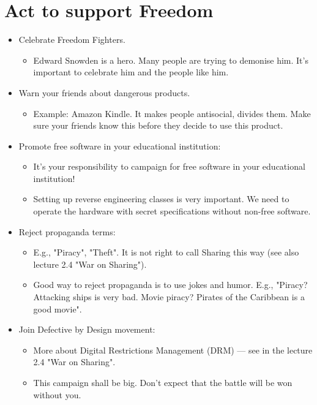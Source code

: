 \documentclass[twoside,openright]{report}
\begin{document}
\section{Act to support Freedom}
\begin{itemize}
 \item    Celebrate Freedom Fighters.
\begin{itemize}
 \item        Edward Snowden is a hero. Many people are trying to demonise him. It's important to celebrate him and the people like him.
\end{itemize}
 \item    Warn your friends about dangerous products.
\begin{itemize}
 \item        Example: Amazon Kindle. It makes people antisocial, divides them. Make sure your friends know this before they decide to use this product.
 \end{itemize}
 \item    Promote free software in your educational institution:
 \begin{itemize}
 \item        It's your responsibility to campaign for free software in your educational institution!
 \item        Setting up reverse engineering classes is very important. We need to operate the hardware with secret specifications without non-free software.
 \end{itemize}
 \item    Reject propaganda terms:
 \begin{itemize}
 \item        E.g., "Piracy", "Theft". It is not right to call Sharing this way (see also lecture 2.4 "War on Sharing").
 \item        Good way to reject propaganda is to use jokes and humor. E.g., "Piracy? Attacking ships is very bad. Movie piracy? Pirates of the Caribbean is a good movie".
 \end{itemize}
 \item    Join Defective by Design movement:
 \begin{itemize}
 \item        More about Digital Restrictions Management (DRM) --- see in the lecture 2.4 "War on Sharing".
 \item        This campaign shall be big. Don't expect that the battle will be won without you.
 \end{itemize}

\end{itemize}
\end{document}
